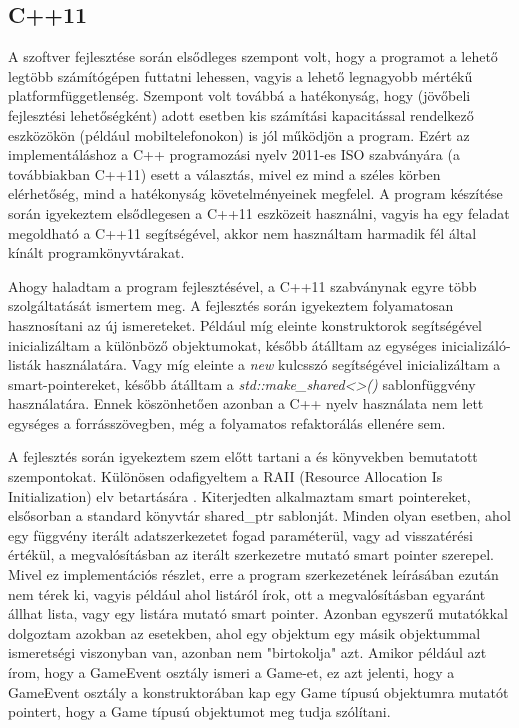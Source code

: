 \documentclass[12pt, twoside]{report}
\begin{document}
\subsection{C++11}

A szoftver fejlesztése során elsődleges szempont volt, hogy a programot a lehető legtöbb számítógépen futtatni lehessen, vagyis a lehető legnagyobb mértékű platformfüggetlenség. Szempont volt továbbá a hatékonyság, hogy (jövőbeli fejlesztési lehetőségként) adott esetben kis számítási kapacitással rendelkező eszközökön (például mobiltelefonokon) is jól működjön a program. Ezért az implementáláshoz a C++ programozási nyelv 2011-es ISO szabványára (a továbbiakban C++11) esett a választás, mivel ez mind a széles körben elérhetőség, mind a hatékonyság követelményeinek megfelel. A program készítése során igyekeztem elsődlegesen a C++11 eszközeit használni, vagyis ha egy feladat megoldható a C++11 segítségével, akkor nem használtam harmadik fél által kínált programkönyvtárakat.

Ahogy haladtam a program fejlesztésével, a C++11 szabványnak egyre több szol\-gál\-ta\-tá\-sát ismertem meg. A fejlesztés során igyekeztem folyamatosan hasznosítani az új ismereteket. Például míg eleinte konstruktorok segítségével inicializáltam a különböző objektumokat, később átálltam az egységes inicializáló-listák használatára. Vagy míg eleinte a \emph{new} kulcsszó segítségével inicializáltam a smart-pointereket, később átálltam a \emph{std::make\_shared\textless\textgreater()} sablonfüggvény használatára. Ennek köszönhetően azonban a C++ nyelv használata nem lett egységes a forrásszövegben, még a folyamatos refaktorálás ellenére sem.

A fejlesztés során igyekeztem szem előtt tartani a \cite{codingrules} és \cite{effective} könyvekben bemutatott szempontokat. Különösen odafigyeltem a RAII (Resource Allocation Is Initialization) elv betartására \cite{raii}. Kiterjedten alkalmaztam smart pointereket, elsősorban a standard könyvtár shared\_ptr sablonját. Minden olyan esetben, ahol egy függvény iterált adatszerkezetet fogad paraméterül, vagy ad visszatérési értékül, a megvalósításban az iterált szerkezetre mutató smart pointer szerepel. Mivel ez implementációs részlet, erre a program szerkezetének leírásában ezután nem térek ki, vagyis például ahol listáról írok, ott a megvalósításban egyaránt állhat lista, vagy egy listára mutató smart pointer. Azonban egyszerű mutatókkal dolgoztam azokban az esetekben, ahol egy objektum egy másik objektummal ismeretségi viszonyban van, azonban nem "birtokolja" azt. Amikor például azt írom, hogy a GameEvent osztály ismeri a Game-et, ez azt jelenti, hogy a GameEvent osztály a konstruktorában kap egy Game típusú objektumra mutatót pointert, hogy a Game típusú objektumot meg tudja szólítani.
\end{document}
